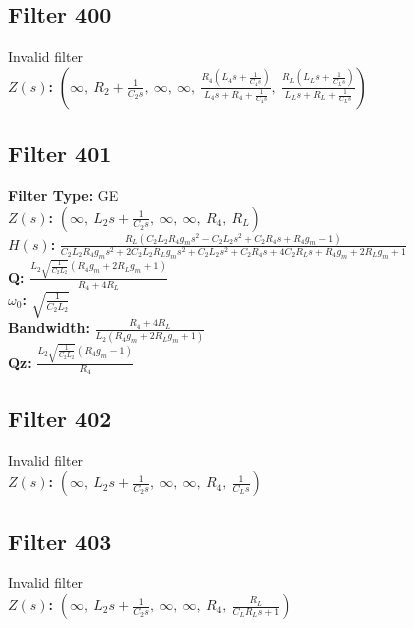 \documentclass{article}
\begin{document}
\subsection*{Filter 400}
Invalid filter \\ 
\textbf{$Z(s)$:} $\left( \infty, \  R_{2} + \frac{1}{C_{2} s}, \  \infty, \  \infty, \  \frac{R_{4} \left(L_{4} s + \frac{1}{C_{4} s}\right)}{L_{4} s + R_{4} + \frac{1}{C_{4} s}}, \  \frac{R_{L} \left(L_{L} s + \frac{1}{C_{L} s}\right)}{L_{L} s + R_{L} + \frac{1}{C_{L} s}}\right)$ \\ 
\subsection*{Filter 401}
\textbf{Filter Type:} GE \\ 
\textbf{$Z(s)$:} $\left( \infty, \  L_{2} s + \frac{1}{C_{2} s}, \  \infty, \  \infty, \  R_{4}, \  R_{L}\right)$ \\ 
\textbf{$H(s)$:} $\frac{R_{L} \left(C_{2} L_{2} R_{4} g_{m} s^{2} - C_{2} L_{2} s^{2} + C_{2} R_{4} s + R_{4} g_{m} - 1\right)}{C_{2} L_{2} R_{4} g_{m} s^{2} + 2 C_{2} L_{2} R_{L} g_{m} s^{2} + C_{2} L_{2} s^{2} + C_{2} R_{4} s + 4 C_{2} R_{L} s + R_{4} g_{m} + 2 R_{L} g_{m} + 1}$ \\ 
\textbf{Q:} $\frac{L_{2} \sqrt{\frac{1}{C_{2} L_{2}}} \left(R_{4} g_{m} + 2 R_{L} g_{m} + 1\right)}{R_{4} + 4 R_{L}}$ \\ 
\textbf{$\omega_0$:} $\sqrt{\frac{1}{C_{2} L_{2}}}$ \\ 
\textbf{Bandwidth:} $\frac{R_{4} + 4 R_{L}}{L_{2} \left(R_{4} g_{m} + 2 R_{L} g_{m} + 1\right)}$ \\ 
\textbf{Qz:} $\frac{L_{2} \sqrt{\frac{1}{C_{2} L_{2}}} \left(R_{4} g_{m} - 1\right)}{R_{4}}$ \\ 
\subsection*{Filter 402}
Invalid filter \\ 
\textbf{$Z(s)$:} $\left( \infty, \  L_{2} s + \frac{1}{C_{2} s}, \  \infty, \  \infty, \  R_{4}, \  \frac{1}{C_{L} s}\right)$ \\ 
\subsection*{Filter 403}
Invalid filter \\ 
\textbf{$Z(s)$:} $\left( \infty, \  L_{2} s + \frac{1}{C_{2} s}, \  \infty, \  \infty, \  R_{4}, \  \frac{R_{L}}{C_{L} R_{L} s + 1}\right)$ \\ 
\end{document}
